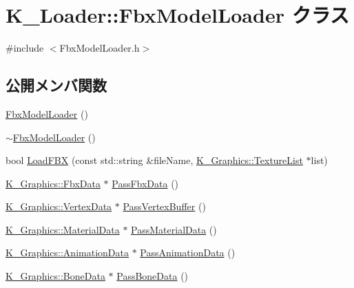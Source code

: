\hypertarget{class_k___loader_1_1_fbx_model_loader}{}\section{K\+\_\+\+Loader\+:\+:Fbx\+Model\+Loader クラス}
\label{class_k___loader_1_1_fbx_model_loader}


{\ttfamily \#include $<$Fbx\+Model\+Loader.\+h$>$}

\subsection*{公開メンバ関数}
\begin{DoxyCompactItemize}
\item 
\mbox{\hyperlink{class_k___loader_1_1_fbx_model_loader_ac1fa3c46e19fae68e2603e66bf59c722}{Fbx\+Model\+Loader}} ()
\item 
\mbox{\hyperlink{class_k___loader_1_1_fbx_model_loader_a05f5c4c6e370fe2df1eab0c44ffffd3b}{$\sim$\+Fbx\+Model\+Loader}} ()
\item 
bool \mbox{\hyperlink{class_k___loader_1_1_fbx_model_loader_a3b0ef1c5d8eab4ca054cd6c02573af88}{Load\+F\+BX}} (const std\+::string \&file\+Name, \mbox{\hyperlink{class_k___graphics_1_1_texture_list}{K\+\_\+\+Graphics\+::\+Texture\+List}} $\ast$list)
\item 
\mbox{\hyperlink{class_k___graphics_1_1_fbx_data}{K\+\_\+\+Graphics\+::\+Fbx\+Data}} $\ast$ \mbox{\hyperlink{class_k___loader_1_1_fbx_model_loader_ac53152df10e62fbe22856d25ca419c1e}{Pass\+Fbx\+Data}} ()
\item 
\mbox{\hyperlink{class_k___graphics_1_1_vertex_data}{K\+\_\+\+Graphics\+::\+Vertex\+Data}} $\ast$ \mbox{\hyperlink{class_k___loader_1_1_fbx_model_loader_ada2dd218e597185dfd8bcb9369404bb0}{Pass\+Vertex\+Buffer}} ()
\item 
\mbox{\hyperlink{class_k___graphics_1_1_material_data}{K\+\_\+\+Graphics\+::\+Material\+Data}} $\ast$ \mbox{\hyperlink{class_k___loader_1_1_fbx_model_loader_a0a0b3df0dc9f4fa9832bf5740b34fa16}{Pass\+Material\+Data}} ()
\item 
\mbox{\hyperlink{class_k___graphics_1_1_animation_data}{K\+\_\+\+Graphics\+::\+Animation\+Data}} $\ast$ \mbox{\hyperlink{class_k___loader_1_1_fbx_model_loader_a71eebd03b1333facbfef984a4c4d5d09}{Pass\+Animation\+Data}} ()
\item 
\mbox{\hyperlink{class_k___graphics_1_1_bone_data}{K\+\_\+\+Graphics\+::\+Bone\+Data}} $\ast$ \mbox{\hyperlink{class_k___loader_1_1_fbx_model_loader_a008c36345eebef97d18a49b57c49f646}{Pass\+Bone\+Data}} ()
\end{DoxyCompactItemize}


